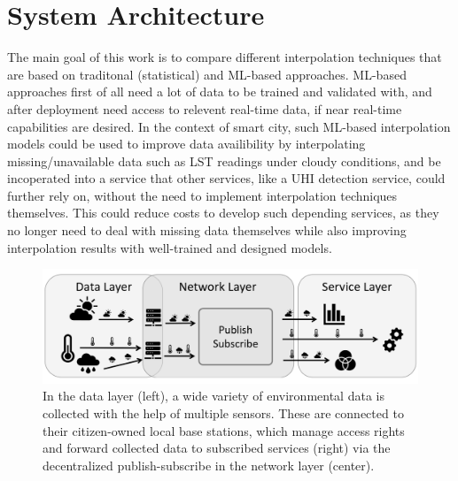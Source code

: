 \chapter{System Architecture}
\label{chap:System Architecture}

The main goal of this work is to compare different interpolation techniques that are based on traditonal (statistical) and ML-based approaches. ML-based approaches first of all need a lot of data to be trained and validated with, and after deployment need access to relevent real-time data, if near real-time capabilities are desired. In the context of smart city, such ML-based interpolation models could be used to improve data availibility by interpolating missing/unavailable data such as LST readings under cloudy conditions, and be incoperated into a service that other services, like a UHI detection service, could further rely on, without the need to implement interpolation techniques themselves. This could reduce costs to develop such depending services, as they no longer need to deal with missing data themselves while also improving interpolation results with well-trained and designed models.

\begin{figure}[h]
    \centering
    \includegraphics[width=\textwidth]{images/expose-system-architecture.png}
    \caption{In the data layer (left), a wide variety of environmental data is collected with the help of multiple sensors. These are connected to their citizen-owned local base stations, which manage access rights and forward collected data to subscribed services (right) via the decentralized publish-subscribe in the network layer (center).}
    \label{fig:system-architecture-overview} %
\end{figure}

